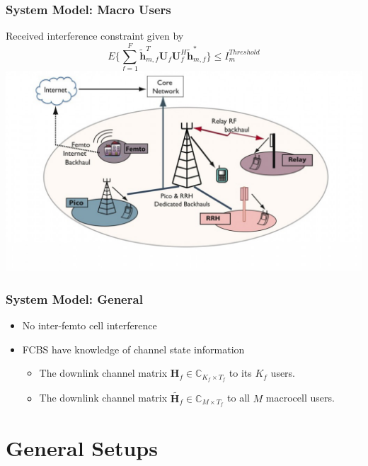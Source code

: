 \documentclass[10pt,tgadventor, onlymath]{beamer}
\begin{document}
\begin{frame}
\frametitle{System Model: Macro Users}
	Received interference constraint given by 
	\begin{equation}
	E\{\sum^F_{f=1} \mathbf{\tilde{h}}_{m,f}^T  \mathbf{U}_{f}					
	\mathbf{U}_{f}^{H} \mathbf{\tilde{h}}_{m,f}^*\} \leq I^{Threshold}		
	_{m}
	\end{equation}
	\bigskip
	\centering
		\includegraphics[scale=.2]{het_net}

\end{frame}

\begin{frame}
\frametitle{System Model: General}
\begin{itemize}
\setlength\itemsep{2em}

\item 
	No inter-femto cell interference
\item 
	FCBS have knowledge of channel state information 
	\begin{itemize}
	\item 
	The downlink channel matrix $\mathbf{H}_f \in \mathbb{C}_{K_{f} \times T_{f}} $ to its $K_{f} $ users.
	\item The downlink channel matrix $\tilde{\mathbf{H}_{f}} \in \mathbb{C}_{M \times T_{f}}$ 
	to all $M$ macrocell users.
	\end{itemize}
\end{itemize}
\end{frame}


\section{General Setups}
\end{document}
